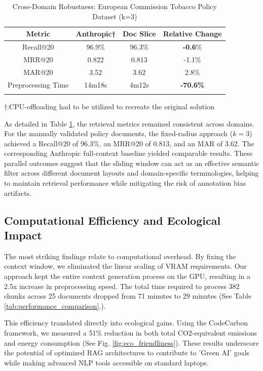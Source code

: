 \documentclass[conference]{IEEEtran}
\begin{document}
\begin{table}[ht!]
    \centering
    \caption{Cross-Domain Robustness: European Commission Tobacco Policy Dataset (k=3)}
    \label{tab:tobacco_results}
    \begin{tabular}{cccc}
        \toprule
        \textbf{Metric} & \textbf{Anthropic†} & \textbf{Doc Slice} & \textbf{Relative Change} \\
        \midrule
        Recall@20 & 96.9\% & 96.3\% & \textbf{-0.6}\% \\
        MRR@20 & 0.822 & 0.813 & -1.1\% \\
        MAR@20 & 3.52 & 3.62 & 2.8\% \\
        Preprocessing Time & 14m18s & 4m12s & \textbf{-70.6\%} \\
        \bottomrule
        \\
    \end{tabular}
    †:CPU-offloading had to be utilized to recreate the original solution
\end{table}

As detailed in Table \ref{tab:tobacco_results}, the retrieval metrics remained consistent across domains. For the manually validated policy documents, the fixed-radius approach ($k=3$) achieved a Recall@20 of 96.3\%, an MRR@20 of 0.813, and an MAR of 3.62. The corresponding Anthropic full-context baseline yielded comparable results. These parallel outcomes suggest that the sliding window can act as an effective semantic filter across different document layouts and domain-specific terminologies, helping to maintain retrieval performance while mitigating the risk of annotation bias artifacts.

\subsection{Computational Efficiency and Ecological Impact}

The most striking findings relate to computational overhead. By fixing the context window, we eliminated the linear scaling of VRAM requirements. Our approach kept the entire context generation process on the GPU, resulting in a 2.5x increase in preprocessing speed. The total time required to process 382 chunks across 25 documents dropped from 71 minutes to 29 minutes (See Table \ref{tab:performance_comparison}.). 

This efficiency translated directly into ecological gains. Using the CodeCarbon framework, we measured a 51\% reduction in both total CO2-equivalent emissions and energy consumption (See Fig. \ref{fig:eco_friendliness}). These results underscore the potential of optimized RAG architectures to contribute to 'Green AI' goals while making advanced NLP tools accessible on standard laptops. 
\end{document}
